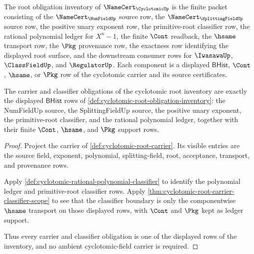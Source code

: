 \begin{definition}
\label{def:cyclotomic-root-obligation-inventory}
The root obligation inventory of $\NameCert_{\CyclotomicUp}$ is the finite
packet consisting of the $\NameCert_{\NumFieldUp}$ source row, the
$\NameCert_{\SplittingFieldUp}$ source row, the positive unary exponent row,
the primitive-root classifier row, the rational polynomial ledger for
$X^n-1$, the finite $\Cont$ readback, the $\hsame$ transport row, the $\Pkg$
provenance row, the exactness row identifying the displayed root surface, and
the downstream consumer rows for $\IwasawaUp$, $\ClassFieldUp$, and
$\RegulatorUp$. Each component is a displayed $\mathsf{BHist}$, $\Cont$,
$\hsame$, or $\Pkg$ row of the cyclotomic carrier and its source certificates.
\end{definition}

\begin{theorem}
\label{thm:cyclotomic-root-carrier-classifier-obligations}
The carrier and classifier obligations of the cyclotomic root inventory are
exactly the displayed $\mathsf{BHist}$ rows of
\autoref{def:cyclotomic-root-obligation-inventory}: the NumFieldUp source, the
SplittingFieldUp source, the positive unary exponent, the primitive-root
classifier, and the rational polynomial ledger, together with their finite
$\Cont$, $\hsame$, and $\Pkg$ support rows.
\end{theorem}
\begin{proof}
Project the carrier of \autoref{def:cyclotomic-root-carrier}. Its visible
entries are the source field, exponent, polynomial, splitting-field, root,
acceptance, transport, and provenance rows.

Apply \autoref{def:cyclotomic-rational-polynomial-classifier} to identify the
polynomial ledger and primitive-root classifier rows. Apply
\autoref{thm:cyclotomic-root-carrier-classifier-scope} to see that the
classifier boundary is only the componentwise $\hsame$ transport on those
displayed rows, with $\Cont$ and $\Pkg$ kept as ledger support.

Thus every carrier and classifier obligation is one of the displayed rows of
the inventory, and no ambient cyclotomic-field carrier is required.
\end{proof}


